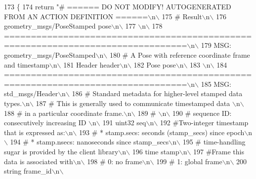 \begin{DoxyCode}
173   \{
174     \textcolor{keywordflow}{return} \textcolor{stringliteral}{"# ====== DO NOT MODIFY! AUTOGENERATED FROM AN ACTION DEFINITION ======\(\backslash\)n\(\backslash\)}
175 \textcolor{stringliteral}{# Result\(\backslash\)n\(\backslash\)}
176 \textcolor{stringliteral}{geometry\_msgs/PoseStamped pose\(\backslash\)n\(\backslash\)}
177 \textcolor{stringliteral}{\(\backslash\)n\(\backslash\)}
178 \textcolor{stringliteral}{================================================================================\(\backslash\)n\(\backslash\)}
179 \textcolor{stringliteral}{MSG: geometry\_msgs/PoseStamped\(\backslash\)n\(\backslash\)}
180 \textcolor{stringliteral}{# A Pose with reference coordinate frame and timestamp\(\backslash\)n\(\backslash\)}
181 \textcolor{stringliteral}{Header header\(\backslash\)n\(\backslash\)}
182 \textcolor{stringliteral}{Pose pose\(\backslash\)n\(\backslash\)}
183 \textcolor{stringliteral}{\(\backslash\)n\(\backslash\)}
184 \textcolor{stringliteral}{================================================================================\(\backslash\)n\(\backslash\)}
185 \textcolor{stringliteral}{MSG: std\_msgs/Header\(\backslash\)n\(\backslash\)}
186 \textcolor{stringliteral}{# Standard metadata for higher-level stamped data types.\(\backslash\)n\(\backslash\)}
187 \textcolor{stringliteral}{# This is generally used to communicate timestamped data \(\backslash\)n\(\backslash\)}
188 \textcolor{stringliteral}{# in a particular coordinate frame.\(\backslash\)n\(\backslash\)}
189 \textcolor{stringliteral}{# \(\backslash\)n\(\backslash\)}
190 \textcolor{stringliteral}{# sequence ID: consecutively increasing ID \(\backslash\)n\(\backslash\)}
191 \textcolor{stringliteral}{uint32 seq\(\backslash\)n\(\backslash\)}
192 \textcolor{stringliteral}{#Two-integer timestamp that is expressed as:\(\backslash\)n\(\backslash\)}
193 \textcolor{stringliteral}{# * stamp.secs: seconds (stamp\_secs) since epoch\(\backslash\)n\(\backslash\)}
194 \textcolor{stringliteral}{# * stamp.nsecs: nanoseconds since stamp\_secs\(\backslash\)n\(\backslash\)}
195 \textcolor{stringliteral}{# time-handling sugar is provided by the client library\(\backslash\)n\(\backslash\)}
196 \textcolor{stringliteral}{time stamp\(\backslash\)n\(\backslash\)}
197 \textcolor{stringliteral}{#Frame this data is associated with\(\backslash\)n\(\backslash\)}
198 \textcolor{stringliteral}{# 0: no frame\(\backslash\)n\(\backslash\)}
199 \textcolor{stringliteral}{# 1: global frame\(\backslash\)n\(\backslash\)}
200 \textcolor{stringliteral}{string frame\_id\(\backslash\)n\(\backslash\)}

\end{DoxyCode}
